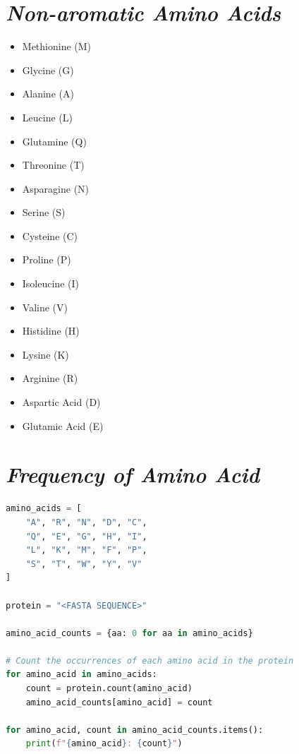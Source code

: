 \documentclass{article}
\begin{document}
\section*{\textit{Non-aromatic Amino Acids}}
\begin{itemize}
    \item Methionine (M)
    \item Glycine (G)
    \item Alanine (A)
    \item Leucine (L)
    \item Glutamine (Q)
    \item Threonine (T)
    \item Asparagine (N)
    \item Serine (S)
    \item Cysteine (C)
    \item Proline (P)
    \item Isoleucine (I)
    \item Valine (V)
    \item Histidine (H)
    \item Lysine (K)
    \item Arginine (R)
    \item Aspartic Acid (D)
    \item Glutamic Acid (E)
\end{itemize}
\newpage
\section*{\textit{Frequency of Amino Acid}}

\begin{lstlisting}[language=Python, caption=Code for freqeuncy of each Amino Acid, label=python_code]
amino_acids = [
    "A", "R", "N", "D", "C",
    "Q", "E", "G", "H", "I",
    "L", "K", "M", "F", "P",
    "S", "T", "W", "Y", "V"
]

protein = "<FASTA SEQUENCE>"

amino_acid_counts = {aa: 0 for aa in amino_acids}

# Count the occurrences of each amino acid in the protein 
for amino_acid in amino_acids:
    count = protein.count(amino_acid)
    amino_acid_counts[amino_acid] = count

for amino_acid, count in amino_acid_counts.items():
    print(f"{amino_acid}: {count}")
\end{lstlisting}
\end{document}
